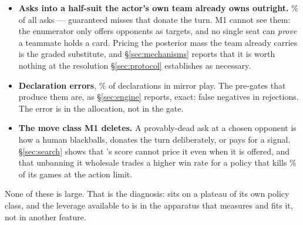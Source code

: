 \begin{itemize}
\item \textbf{Asks into a half-suit the actor's own team already owns outright.}
  \vsixPathFiveOwnlocked\% of all asks --- guaranteed misses that donate the turn. M1 cannot see
  them: the enumerator only offers opponents as targets, and no single seat can \emph{prove} a
  teammate holds a card. Pricing the posterior mass the team already carries is the graded
  substitute, and \S\ref{sec:mechanisms} reports that it is worth nothing at the resolution
  \S\ref{sec:protocol} establishes as necessary.
\item \textbf{Declaration errors}, \vsixPathFiveDeclwrong\% of declarations in mirror play. The
  pre-gates that produce them are, as \S\ref{sec:engine} reports, exact: \vsixGateFalseNeg{} false
  negatives in \vsixGateRejected{} rejections. The error is in the allocation, not in the gate.
\item \textbf{The move class M1 deletes.} A provably-dead ask at a chosen opponent is how a human
  blackballs, donates the turn deliberately, or pays for a signal. \S\ref{sec:search} shows that
  \vfive{}'s score cannot price it even when it is offered, and that unbanning it wholesale trades
  a higher win rate for a policy that kills \vsixDeadPathLimit\% of its games at the action limit.
\end{itemize}

None of these is large. That is the diagnosis: \vfive{} sits on a plateau of its own policy class,
and the leverage available to \vsix{} is in the apparatus that measures and fits it, not in another
feature.
